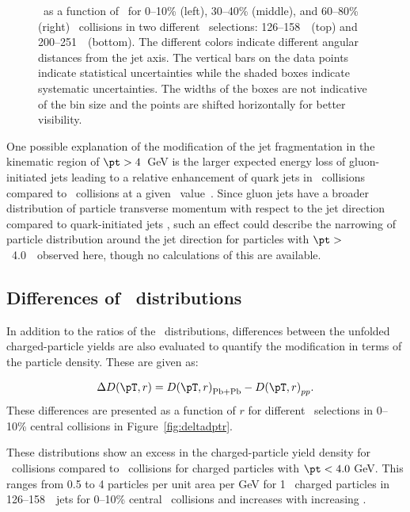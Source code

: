 \begin{figure}[h]
{\begin{tabular}{ccc}
\end{tabular}}
   \caption{\RDptr\ as a function of \pt\ for  0--10\% (left), 30--40\% (middle), and 60--80\% (right) \PbPb\ collisions in two different \ptjet\ selections: 126--158~\GeV\ (top) and 200--251~\GeV\ (bottom).
The different colors indicate different angular distances from the jet axis.
The vertical bars on the data points indicate statistical uncertainties while the shaded boxes indicate systematic uncertainties.
The widths of the boxes are not indicative of the bin size and the points are shifted horizontally for better visibility.}
      \label{fig:pttrkdep}
\end{figure}


One possible explanation of the modification of the jet fragmentation in the kinematic region of \mbox{$\pt > 4$ GeV} is the larger expected energy loss of gluon-initiated jets leading to a relative enhancement of quark jets in \pbpb\ collisions compared to \pp\ collisions at a given \ptjet\ value~\cite{Aaboud:2018hpb, Spousta:2015fca}.
Since gluon jets have a broader distribution of particle transverse momentum with respect to the jet direction compared to quark-initiated jets \cite{OPAL:1995ab}, such an effect could describe the narrowing of particle distribution around the jet direction for particles with $\pt >$~4.0~\GeV\ observed here, though no calculations of this are available.


\subsection{Differences of \Dptr\ distributions}
\label{sec:discussion_delta_dptr}
In addition to the ratios of the \Dptr\ distributions, differences between the unfolded charged-particle yields are also evaluated to quantify the modification in terms of the particle density.
These are given as:

\begin{align*}
\DeltaDptr = \Dptr_{\mathrm{Pb+Pb}} - \Dptr_{pp}.
\end{align*}
These differences are presented as a function of $r$ for different \pt\ selections in 0--10\% central collisions in Figure~\ref{fig:deltadptr}.

These distributions show an excess in the charged-particle yield density for \pbpb\ collisions compared to \pp\ collisions for charged particles with $\pt <4.0$ GeV.
This ranges from 0.5 to 4 particles per unit area per GeV for 1 \GeV\ charged particles in 126--158~\GeV\ jets for 0--10\% central \pbpb\ collisions and increases with increasing \ptjet.

